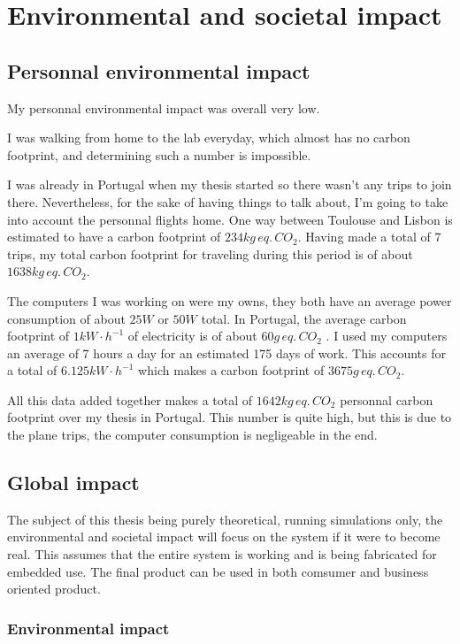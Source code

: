 \section{Environmental and societal impact}

\subsection{Personnal environmental impact}

My personnal environmental impact was overall very low.

I was walking from home to the lab everyday, which almost has no carbon footprint, and determining such a number is impossible.

I was already in Portugal when my thesis started so there wasn't any trips to join there. Nevertheless, for the sake of having things to talk about, I'm going to take into account the personnal flights home. One way between Toulouse and Lisbon is estimated to have a carbon footprint of $234 kg\, eq.\,CO_2$. Having made a total of 7 trips, my total carbon footprint for traveling during this period is of about $1638 kg\, eq.\, CO_2$.

The computers I was working on were my owns, they both have an average power consumption of about $25W$ or $50W$ total. In Portugal, the average carbon footprint of $1kW\cdot h^{-1}$ of electricity is of about $60g\,eq.\,CO_2$ \cite{portugalElec}. I used my computers an average of 7 hours a day for an estimated 175 days of work. This accounts for a total of $6.125kW\cdot h^{-1}$ which makes a carbon footprint of $3 675g\,eq.\,CO_2$.

All this data added together makes a total of $1642kg\,eq.\,CO_2$ personnal carbon footprint over my thesis in Portugal. This number is quite high, but this is due to the plane trips, the computer consumption is negligeable in the end.

\subsection{Global impact}

The subject of this thesis being purely theoretical, running simulations only, the environmental and societal impact will focus on the system if it were to become real. This assumes that the entire system is working and is being fabricated for embedded use. The final product can be used in both comsumer and business oriented product.

\subsubsection{Environmental impact}\label{subsubsec:envImp}

